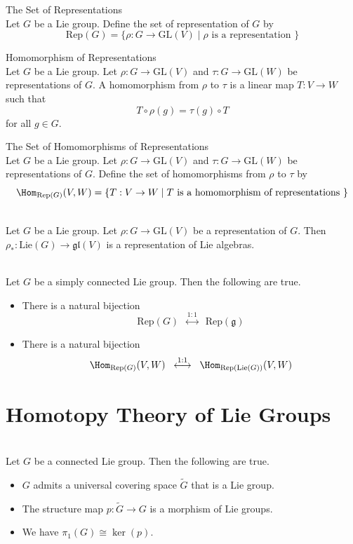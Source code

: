 \documentclass[a4paper]{article}
\begin{document}
\begin{defn}{The Set of Representations}{}\\
Let $G$ be a Lie group. Define the set of representation of $G$ by $$\text{Rep}(G)=\{\rho:G\to\text{GL}(V)\;|\;\rho\text{ is a representation }\}$$
\end{defn}

\begin{defn}{Homomorphism of Representations}{}\\
Let $G$ be a Lie group. Let $\rho:G\to\text{GL}(V)$ and $\tau:G\to\text{GL}(W)$ be representations of $G$. A homomorphism from $\rho$ to $\tau$ is a linear map $T:V\to W$ such that $$T\circ\rho(g)=\tau(g)\circ T$$ for all $g\in G$. 
\end{defn}

\begin{defn}{The Set of Homomorphisms of Representations}{}\\
Let $G$ be a Lie group. Let $\rho:G\to\text{GL}(V)$ and $\tau:G\to\text{GL}(W)$ be representations of $G$. Define the set of homomorphisms from $\rho$ to $\tau$ by $$\Hom_{\text{Rep}(G)}(V,W)=\{T:V\to W\;|\;T\text{ is a homomorphism of representations }\}$$
\end{defn}

\begin{prp}{}{}\\
Let $G$ be a Lie group. Let $\rho:G\to\text{GL}(V)$ be a representation of $G$. Then $\rho_\ast:\text{Lie}(G)\to\mathfrak{gl}(V)$ is a representation of Lie algebras. 
\end{prp}

\begin{prp}{}{}\\
Let $G$ be a simply connected Lie group. Then the following are true. 
\begin{itemize}
\item There is a natural bijection $$\text{Rep}(G)\;\;\overset{1:1}{\longleftrightarrow}\;\;\text{Rep}(\mathfrak{g})$$
\item There is a natural bijection $$\Hom_{\text{Rep}(G)}(V,W)\;\;\overset{1:1}{\longleftrightarrow}\;\;\Hom_{\text{Rep}(\text{Lie}(G))}(V,W)$$
\end{itemize}
\end{prp}

\pagebreak
\section{Homotopy Theory of Lie Groups}
\begin{prp}{}{}\\
Let $G$ be a connected Lie group. Then the following are true. 
\begin{itemize}
\item $G$ admits a universal covering space $\widetilde{G}$ that is a Lie group. 
\item The structure map $p:\widetilde{G}\to G$ is a morphism of Lie groups. 
\item We have $\pi_1(G)\cong\ker(p)$. 
\end{itemize}
\end{prp}
\end{document}

